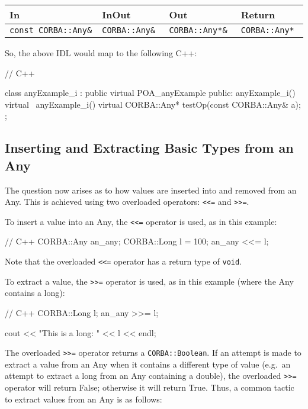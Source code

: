 \documentclass[11pt,twoside,a4paper]{book}
\newcommand{\type}[1]{\texttt{#1}}
\newcommand{\code}[1]{\texttt{#1}}
\begin{document}
\mbox{}

{\small
\begin{tabular}{llll}
{\bf In }                & {\bf InOut }       & {\bf Out }           & 
{\bf Return }                                                   \\ \hline
{\tt const CORBA::Any\& }& {\tt CORBA::Any\& }& {\tt CORBA::Any*\& } & 
{\tt CORBA::Any* }
\end{tabular}
}

\mbox{}

\noindent So, the above IDL would map to the following C++:

\begin{cxxlisting}
// C++

class anyExample_i : public virtual POA_anyExample {
public:
  anyExample_i() { }
  virtual ~anyExample_i() { }
  virtual CORBA::Any* testOp(const CORBA::Any& a);
};
\end{cxxlisting}


\subsection{Inserting and Extracting Basic Types from an Any}

The question now arises as to how values are inserted into and removed
from an Any. This is achieved using two overloaded operators:
\code{<{}<=} and \code{>{}>=}.

To insert a value into an Any, the \code{<{}<=} operator is used, as
in this example:

\begin{cxxlisting}
// C++
CORBA::Any an_any;
CORBA::Long l = 100;
an_any <<= l;
\end{cxxlisting}

\noindent Note that the overloaded \code{<{}<=} operator has a return
type of \type{void}.

To extract a value, the \code{>{}>=} operator is used, as in this
example (where the Any contains a long):

\begin{cxxlisting}
// C++
CORBA::Long l;
an_any >>= l;

cout << "This is a long: " << l << endl;
\end{cxxlisting}


The overloaded \code{>{}>=} operator returns a \type{CORBA::Boolean}.
If an attempt is made to extract a value from an Any when it contains
a different type of value (e.g.\ an attempt to extract a long from an
Any containing a double), the overloaded \code{>{}>=} operator will
return False; otherwise it will return True. Thus, a common tactic to
extract values from an Any is as follows:
\end{document}
